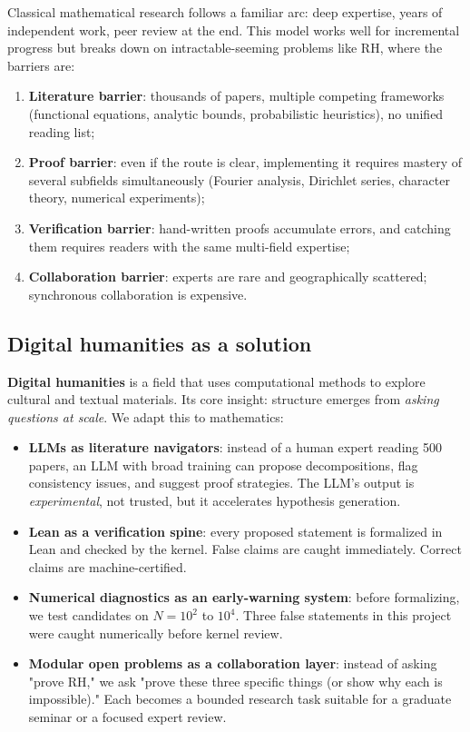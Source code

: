 \documentclass[11pt,a4paper]{article}
\begin{document}
Classical mathematical research follows a familiar arc: deep expertise, years of independent work, peer review at the end. This model works well for incremental progress but breaks down on intractable-seeming problems like RH, where the barriers are:
\begin{enumerate}
\item \textbf{Literature barrier}: thousands of papers, multiple competing frameworks (functional equations, analytic bounds, probabilistic heuristics), no unified reading list;
\item \textbf{Proof barrier}: even if the route is clear, implementing it requires mastery of several subfields simultaneously (Fourier analysis, Dirichlet series, character theory, numerical experiments);
\item \textbf{Verification barrier}: hand-written proofs accumulate errors, and catching them requires readers with the same multi-field expertise;
\item \textbf{Collaboration barrier}: experts are rare and geographically scattered; synchronous collaboration is expensive.
\end{enumerate}

\subsection{Digital humanities as a solution}

\textbf{Digital humanities} is a field that uses computational methods to explore cultural and textual materials. Its core insight: structure emerges from \emph{asking questions at scale}. We adapt this to mathematics:

\begin{itemize}
\item \textbf{LLMs as literature navigators}: instead of a human expert reading 500 papers, an LLM with broad training can propose decompositions, flag consistency issues, and suggest proof strategies. The LLM's output is \emph{experimental}, not trusted, but it accelerates hypothesis generation.

\item \textbf{Lean as a verification spine}: every proposed statement is formalized in Lean and checked by the kernel. False claims are caught immediately. Correct claims are machine-certified.

\item \textbf{Numerical diagnostics as an early-warning system}: before formalizing, we test candidates on $N=10^2$ to $10^4$. Three false statements in this project were caught numerically before kernel review.

\item \textbf{Modular open problems as a collaboration layer}: instead of asking "prove RH," we ask "prove these three specific things (or show why each is impossible)." Each becomes a bounded research task suitable for a graduate seminar or a focused expert review.
\end{itemize}
\end{document}
